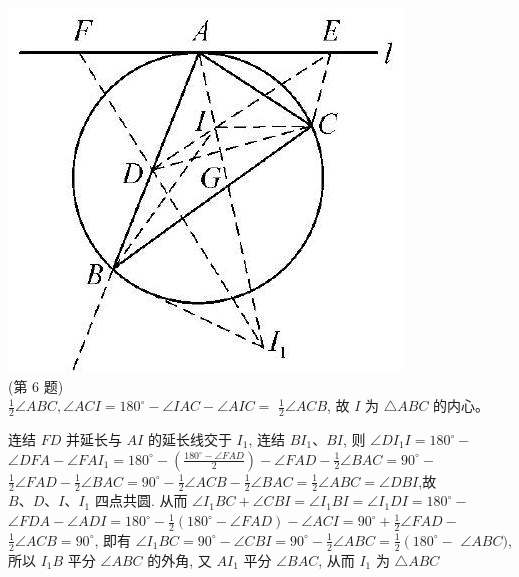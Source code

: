 \documentclass[10pt]{article}
\begin{document}
\includegraphics[max width=\textwidth, center]{2024_10_30_66b8e5e701da2093c133g-105(1)}\\
(第 6 题)\\
$\frac{1}{2} \angle A B C, \angle A C I=180^{\circ}-\angle I A C-\angle A I C=$ $\frac{1}{2} \angle A C B$, 故 $I$ 为 $\triangle A B C$ 的内心。

连结 $F D$ 并延长与 $A I$ 的延长线交于 $I_{1}$, 连结 $B I_{1} 、 B I$, 则 $\angle D I_{1} I=180^{\circ}-$ $\angle D F A-\angle F A I_{1}=180^{\circ}-\left(\frac{180^{\circ}-\angle F A D}{2}\right)-\angle F A D-\frac{1}{2} \angle B A C=90^{\circ}-$ $\frac{1}{2} \angle F A D-\frac{1}{2} \angle B A C=90^{\circ}-\frac{1}{2} \angle A C B-\frac{1}{2} \angle B A C=\frac{1}{2} \angle A B C=\angle D B I$,故 $B 、 D 、 I 、 I_{1}$ 四点共圆. 从而 $\angle I_{1} B C+\angle C B I=\angle I_{1} B I=\angle I_{1} D I=180^{\circ}-$ $\angle F D A-\angle A D I=180^{\circ}-\frac{1}{2}\left(180^{\circ}-\angle F A D\right)-\angle A C I=90^{\circ}+\frac{1}{2} \angle F A D-$ $\frac{1}{2} \angle A C B=90^{\circ}$, 即有 $\angle I_{1} B C=90^{\circ}-\angle C B I=90^{\circ}-\frac{1}{2} \angle A B C=\frac{1}{2}\left(180^{\circ}-\right.$ $\angle A B C)$, 所以 $I_{1} B$ 平分 $\angle A B C$ 的外角, 又 $A I_{1}$ 平分 $\angle B A C$, 从而 $I_{1}$ 为 $\triangle A B C$
\end{document}

